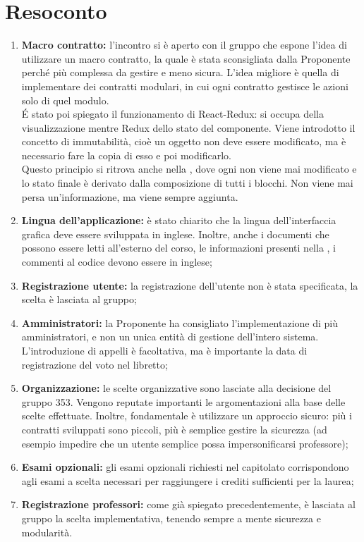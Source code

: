 \documentclass[VER-2017-12-08.tex]{subfiles}
\begin{document}
\chapter{Resoconto}
\begin{enumerate}
	\item \textbf{Macro contratto:} l'incontro si è aperto con il gruppo \gruppo che espone l'idea di utilizzare un macro contratto, la quale è stata sconsigliata dalla Proponente perché più complessa da gestire e meno sicura. L'idea migliore è quella di implementare dei contratti modulari, in cui ogni contratto gestisce le azioni solo di quel modulo.\\
	\'{E} stato poi spiegato il funzionamento di React-Redux:  si occupa della visualizzazione mentre Redux dello stato del componente. Viene introdotto il concetto di immutabilità, cioè un oggetto non deve essere modificato, ma è necessario fare la copia di esso e poi modificarlo.\\
	Questo principio si ritrova anche nella , dove ogni  non viene mai modificato e lo stato finale è derivato dalla composizione di tutti i blocchi. Non viene mai persa un'informazione, ma viene sempre aggiunta.
	
	\item \textbf{Lingua dell'applicazione:} è stato chiarito che la lingua dell'interfaccia grafica deve essere sviluppata in inglese. Inoltre, anche i documenti che possono essere letti all'esterno del corso, le informazioni presenti nella  , i commenti al codice devono essere in inglese;
	
	\item \textbf{Registrazione utente:} la registrazione dell'utente non è stata specificata, la scelta è lasciata al gruppo;
	
	\item \textbf{Amministratori:} la Proponente ha consigliato l'implementazione di più amministratori, e non un unica entità di gestione dell'intero sistema. L'introduzione di appelli è facoltativa, ma è importante la data di registrazione del voto nel libretto;
	
	\item \textbf{Organizzazione:} le scelte organizzative sono lasciate alla decisione del gruppo 353. Vengono reputate importanti le argomentazioni alla base delle scelte effettuate. Inoltre, fondamentale è utilizzare un approccio sicuro: più i contratti sviluppati sono piccoli, più è semplice gestire la sicurezza (ad esempio impedire che un utente semplice possa impersonificarsi professore);
	
	\item \textbf{Esami opzionali:} gli esami opzionali richiesti nel capitolato corrispondono agli esami a scelta necessari per raggiungere i crediti sufficienti per la laurea;
	
	\item \textbf{Registrazione professori:} come già spiegato precedentemente, è lasciata al gruppo la scelta implementativa, tenendo sempre a mente sicurezza e modularità.
\end{enumerate}
\end{document}
